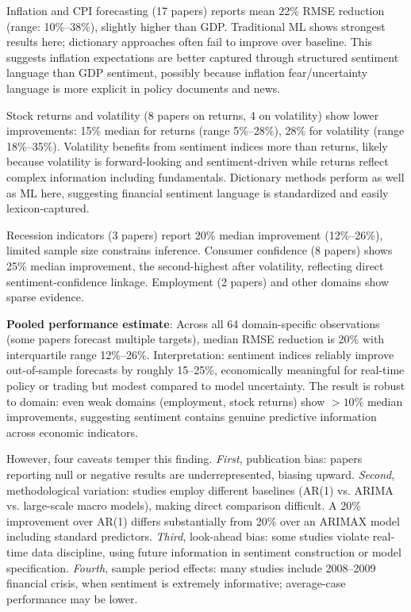 Inflation and CPI forecasting (17 papers) reports mean 22\% RMSE reduction (range: 10\%--38\%), slightly higher than GDP. Traditional ML shows strongest results here; dictionary approaches often fail to improve over baseline. This suggests inflation expectations are better captured through structured sentiment language than GDP sentiment, possibly because inflation fear/uncertainty language is more explicit in policy documents and news.

Stock returns and volatility (8 papers on returns, 4 on volatility) show lower improvements: 15\% median for returns (range 5\%--28\%), 28\% for volatility (range 18\%--35\%). Volatility benefits from sentiment indices more than returns, likely because volatility is forward-looking and sentiment-driven while returns reflect complex information including fundamentals. Dictionary methods perform as well as ML here, suggesting financial sentiment language is standardized and easily lexicon-captured.

Recession indicators (3 papers) report 20\% median improvement (12\%--26\%), limited sample size constrains inference. Consumer confidence (8 papers) shows 25\% median improvement, the second-highest after volatility, reflecting direct sentiment-confidence linkage. Employment (2 papers) and other domains show sparse evidence.

\textbf{Pooled performance estimate}: Across all 64 domain-specific observations (some papers forecast multiple targets), median RMSE reduction is 20\% with interquartile range 12\%--26\%. Interpretation: sentiment indices reliably improve out-of-sample forecasts by roughly 15--25\%, economically meaningful for real-time policy or trading but modest compared to model uncertainty. The result is robust to domain: even weak domains (employment, stock returns) show $>10\%$ median improvements, suggesting sentiment contains genuine predictive information across economic indicators.

However, four caveats temper this finding. \emph{First}, publication bias: papers reporting null or negative results are underrepresented, biasing upward. \emph{Second}, methodological variation: studies employ different baselines (AR(1) vs. ARIMA vs. large-scale macro models), making direct comparison difficult. A 20\% improvement over AR(1) differs substantially from 20\% over an ARIMAX model including standard predictors. \emph{Third}, look-ahead bias: some studies violate real-time data discipline, using future information in sentiment construction or model specification. \emph{Fourth}, sample period effects: many studies include 2008--2009 financial crisis, when sentiment is extremely informative; average-case performance may be lower.

